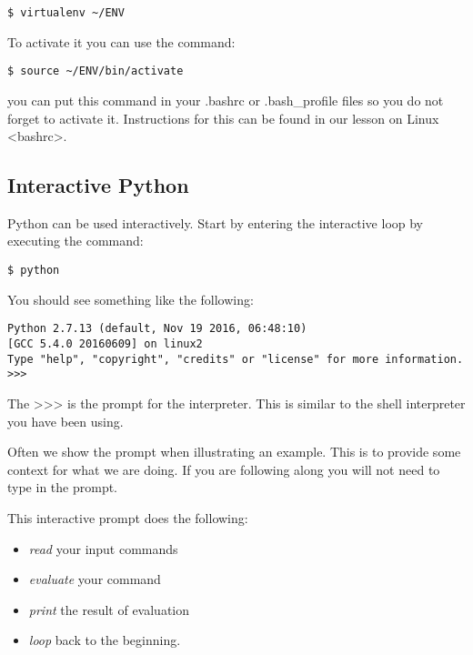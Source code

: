 \begin{verbatim}
$ virtualenv ~/ENV
\end{verbatim}

To activate it you can use the command:

\begin{verbatim}
$ source ~/ENV/bin/activate
\end{verbatim}

you can put this command in your .bashrc or .bash\_profile files so you
do not forget to activate it. Instructions for this can be
found in our lesson on Linux \textless{}bashrc\textgreater{}.

\subsection{Interactive Python}\label{interactive-python}

Python can be used interactively. Start by entering the interactive loop
by executing the command:

\begin{verbatim}
$ python
\end{verbatim}

You should see something like the following:

\begin{verbatim}
Python 2.7.13 (default, Nov 19 2016, 06:48:10)
[GCC 5.4.0 20160609] on linux2
Type "help", "copyright", "credits" or "license" for more information.
>>>
\end{verbatim}

The \textgreater{}\textgreater{}\textgreater{} is the prompt for the
interpreter. This is similar to the shell interpreter you have been
using.

Often we show the prompt when illustrating an example. This is to
provide some context for what we are doing. If you are following along
you will not need to type in the prompt.

This interactive prompt does the following:

\begin{itemize}

\item
  \emph{read} your input commands
\item
  \emph{evaluate} your command
\item
  \emph{print} the result of evaluation
\item
  \emph{loop} back to the beginning.
\end{itemize}

